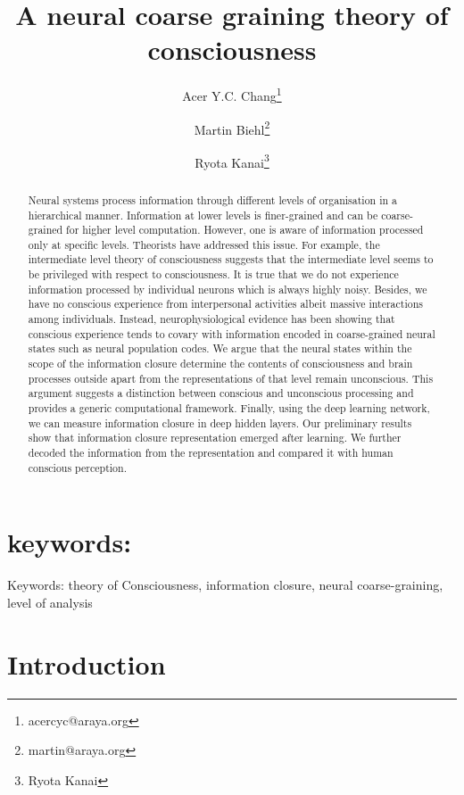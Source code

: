 \documentclass[utf8]{article}
\title{A neural coarse graining theory of consciousness}
\author[1]{Acer Y.C. Chang\thanks{acercyc@araya.org}}
\author[1]{Martin Biehl\thanks{martin@araya.org}}
\author[1]{Ryota Kanai\thanks{Ryota Kanai}}
\affil[1]{ARAYA, Inc., Tokyo, Japan}
\begin{document}
	\maketitle
	
	
	\begin{abstract}
		Neural systems process information through different levels of organisation in a hierarchical manner. Information at lower levels is finer-grained and can be coarse-grained for higher level computation. However, one is aware of information processed only at specific levels. Theorists have addressed this issue. For example, the intermediate level theory of consciousness suggests that the intermediate level seems to be privileged with respect to consciousness. It is true that we do not experience information processed by individual neurons which is always highly noisy. Besides, we have no conscious experience from interpersonal activities albeit massive interactions among individuals. Instead, neurophysiological evidence has been showing that conscious experience tends to covary with information encoded in coarse-grained neural states such as neural population codes. We argue that the neural states within the scope of the information closure determine the contents of consciousness and brain processes outside apart from the representations of that level remain unconscious. This argument suggests a distinction between conscious and unconscious processing and provides a generic computational framework. Finally, using the deep learning network, we can measure information closure in deep hidden layers. Our preliminary results show that information closure representation emerged after learning. We further decoded the information from the representation and compared it with human conscious perception. 
	\end{abstract}
	
	
	\section*{keywords:}
	Keywords: theory of Consciousness, information closure, neural coarse-graining, level of analysis
	
	
	
	\section{Introduction}
	
\end{document}
